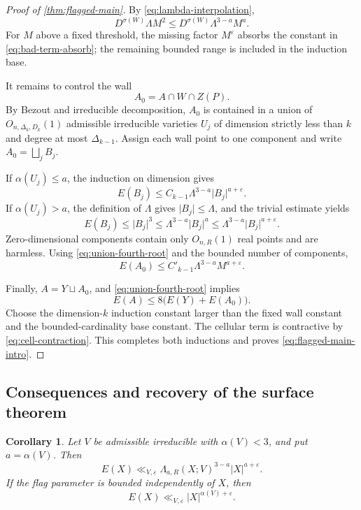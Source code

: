 \documentclass[11pt]{amsart}
\numberwithin{equation}{section}
\newtheorem{corollary}[theorem]{Corollary}
\theoremstyle{definition}
\theoremstyle{remark}
\newcommand{\eps}{\varepsilon}
\newcommand{\1}{\mathbf 1}
\newcommand{\card}[1]{\lvert #1\rvert}
\begin{document}
\begin{proof}[Proof of \cref{thm:flagged-main}]
By \eqref{eq:lambda-interpolation},
\begin{equation}\label{eq:bad-term-absorb}
 D^{\sigma(W)}\Lambda M^2
 \leq D^{\sigma(W)}\Lambda^{3-a}M^a.
\end{equation}
For $M$ above a fixed threshold, the missing factor $M^\eps$ absorbs the constant in \eqref{eq:bad-term-absorb}; the remaining bounded range is included in the induction base.

It remains to control the wall
\[
 A_0=A\cap W\cap Z(P).
\]
By Bezout and irreducible decomposition, $A_0$ is contained in a union of $O_{n,\Delta_k,D_k}(1)$ admissible irreducible varieties $U_j$ of dimension strictly less than $k$ and degree at most $\Delta_{k-1}$.  Assign each wall point to one component and write $A_0=\bigsqcup_jB_j$.

If $\alpha(U_j)\leq a$, the induction on dimension gives
\[
 E(B_j)\leq C_{k-1}\Lambda^{3-a}\card{B_j}^{a+\eps}.
\]
If $\alpha(U_j)>a$, the definition of $\Lambda$ gives $\card{B_j}\leq\Lambda$, and the trivial estimate yields
\begin{equation}\label{eq:worse-wall}
 E(B_j)\leq\card{B_j}^3
 \leq\Lambda^{3-a}\card{B_j}^a
 \leq\Lambda^{3-a}\card{B_j}^{a+\eps}.
\end{equation}
Zero-dimensional components contain only $O_{n,R}(1)$ real points and are harmless.  Using \eqref{eq:union-fourth-root} and the bounded number of components,
\begin{equation}\label{eq:wall-bound}
 E(A_0)\leq C'_{k-1}\Lambda^{3-a}M^{a+\eps}.
\end{equation}

Finally, $A=Y\sqcup A_0$, and \eqref{eq:union-fourth-root} implies
\[
 E(A)\leq8\bigl(E(Y)+E(A_0)\bigr).
\]
Choose the dimension-$k$ induction constant larger than the fixed wall constant and the bounded-cardinality base constant.  The cellular term is contractive by \eqref{eq:cell-contraction}.  This completes both inductions and proves \eqref{eq:flagged-main-intro}.
\end{proof}

\subsection{Consequences and recovery of the surface theorem}
\begin{corollary}\label{cor:intrinsic-flag}
Let $V$ be admissible irreducible with $\alpha(V)<3$, and put $a=\alpha(V)$.  Then
\begin{equation}\label{eq:intrinsic-flag}
 E(X)\ll_{V,\eps}
 \Lambda_{a,R}(X;V)^{3-a}\card X^{a+\eps}.
\end{equation}
If the flag parameter is bounded independently of $X$, then
\[
 E(X)\ll_{V,\eps}\card X^{\alpha(V)+\eps}.
\]
\end{corollary}
\end{document}
